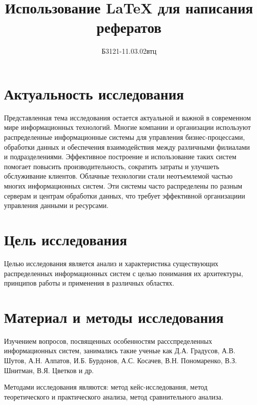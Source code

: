 \documentclass[report, draught]{fefudoc}
\author{Б3121-11.03.02втц}{Созонтов А. В.}
\title{Использование \LaTeX{} для написания рефератов} %
\begin{document}
\frontpage
\tableofcontents

\section{Актуальность исследования}

Представленная тема исследования остается актуальной и важной в современном мире информационных технологий. Многие компании и организации используют распределенные информационные системы для управления бизнес-процессами, обработки данных и обеспечения взаимодействия между различными филиалами и подразделениями. Эффективное построение и использование таких систем помогает повысить производительность, сократить затраты и улучшеть обслуживание клиентов. Облачные технологии стали неотъемлемой частью многих информационных систем. Эти системы часто распределены по разным серверам и центрам обработки данных, что требует эффективной организациии управления данными и ресурсами.

\section{Цель исследования}
Целью исследования является анализ и характеристика существующих распределенных информационных систем с целью понимания их архитектуры, принципов работы и применения в различных областях.

\section{Материал и методы исследования}
Изучением вопросов, посвященных особенностям рассспределенных информационных систем, занимались такие ученые как Д.А. Градусов, А.В. Шутов, А.Н. Алпатов, И.Б. Бурдонов, А.С. Косачев, В.Н. Пономаренко, В.З. Шнитман, В.Я. Цветков и др.

Методами исследования являются: метод кейс-исследования, метод теоретического и практического анализа, метод сравнительного анализа.
\end{document}
